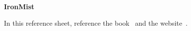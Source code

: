 \documentclass{report}
\newcommand{\chapfnt}{\fontsize{16}{19}}
\begin{document}
\pagestyle{empty}

\centerline{\chapfnt\textbf{IronMist}}

In this reference sheet, reference the book~\cite{CLRS} and the website~\cite{Wikipedia}.

\begin{comment}
c
c++
c++ 11
c#
java
coffee
python
lua
ruby
javascript
typescript
php
css
html
haskell
\end{comment}



\pagebreak
\printbibliography{}
\end{document}
